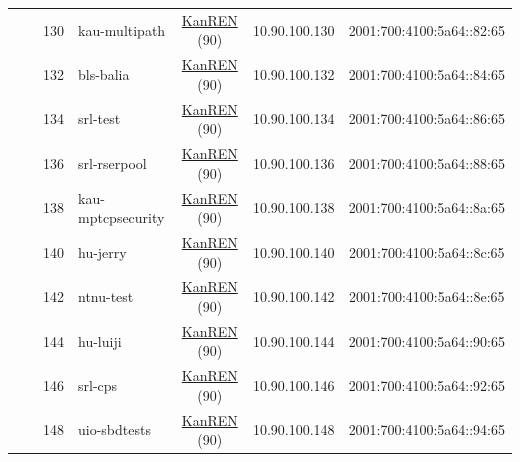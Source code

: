 \begin{small}
\begin{center}
\begin{longtable}{|c|c|c|c|c|c|c|c|}
  &  & \tiny{130} & \multicolumn{1}{|l|}{\tiny{kau-multipath}} & \multicolumn{2}{|c|}{\tiny{\href{http://www.kanren.net}{KanREN} (90)}} & \tiny{10.90.100.130} & \tiny{2001:700:4100:5a64::82:65} \\* \cline{3-3}\cline{4-4}\cline{5-5}\cline{6-6}\cline{7-7}\cline{8-8}
  &  & \tiny{132} & \multicolumn{1}{|l|}{\tiny{bls-balia}} & \multicolumn{2}{|c|}{\tiny{\href{http://www.kanren.net}{KanREN} (90)}} & \tiny{10.90.100.132} & \tiny{2001:700:4100:5a64::84:65} \\* \cline{3-3}\cline{4-4}\cline{5-5}\cline{6-6}\cline{7-7}\cline{8-8}
  &  & \tiny{134} & \multicolumn{1}{|l|}{\tiny{srl-test}} & \multicolumn{2}{|c|}{\tiny{\href{http://www.kanren.net}{KanREN} (90)}} & \tiny{10.90.100.134} & \tiny{2001:700:4100:5a64::86:65} \\* \cline{3-3}\cline{4-4}\cline{5-5}\cline{6-6}\cline{7-7}\cline{8-8}
  &  & \tiny{136} & \multicolumn{1}{|l|}{\tiny{srl-rserpool}} & \multicolumn{2}{|c|}{\tiny{\href{http://www.kanren.net}{KanREN} (90)}} & \tiny{10.90.100.136} & \tiny{2001:700:4100:5a64::88:65} \\* \cline{3-3}\cline{4-4}\cline{5-5}\cline{6-6}\cline{7-7}\cline{8-8}
  &  & \tiny{138} & \multicolumn{1}{|l|}{\tiny{kau-mptcpsecurity}} & \multicolumn{2}{|c|}{\tiny{\href{http://www.kanren.net}{KanREN} (90)}} & \tiny{10.90.100.138} & \tiny{2001:700:4100:5a64::8a:65} \\* \cline{3-3}\cline{4-4}\cline{5-5}\cline{6-6}\cline{7-7}\cline{8-8}
  &  & \tiny{140} & \multicolumn{1}{|l|}{\tiny{hu-jerry}} & \multicolumn{2}{|c|}{\tiny{\href{http://www.kanren.net}{KanREN} (90)}} & \tiny{10.90.100.140} & \tiny{2001:700:4100:5a64::8c:65} \\* \cline{3-3}\cline{4-4}\cline{5-5}\cline{6-6}\cline{7-7}\cline{8-8}
  &  & \tiny{142} & \multicolumn{1}{|l|}{\tiny{ntnu-test}} & \multicolumn{2}{|c|}{\tiny{\href{http://www.kanren.net}{KanREN} (90)}} & \tiny{10.90.100.142} & \tiny{2001:700:4100:5a64::8e:65} \\* \cline{3-3}\cline{4-4}\cline{5-5}\cline{6-6}\cline{7-7}\cline{8-8}
  &  & \tiny{144} & \multicolumn{1}{|l|}{\tiny{hu-luiji}} & \multicolumn{2}{|c|}{\tiny{\href{http://www.kanren.net}{KanREN} (90)}} & \tiny{10.90.100.144} & \tiny{2001:700:4100:5a64::90:65} \\* \cline{3-3}\cline{4-4}\cline{5-5}\cline{6-6}\cline{7-7}\cline{8-8}
  &  & \tiny{146} & \multicolumn{1}{|l|}{\tiny{srl-cps}} & \multicolumn{2}{|c|}{\tiny{\href{http://www.kanren.net}{KanREN} (90)}} & \tiny{10.90.100.146} & \tiny{2001:700:4100:5a64::92:65} \\* \cline{3-3}\cline{4-4}\cline{5-5}\cline{6-6}\cline{7-7}\cline{8-8}
  &  & \tiny{148} & \multicolumn{1}{|l|}{\tiny{uio-sbdtests}} & \multicolumn{2}{|c|}{\tiny{\href{http://www.kanren.net}{KanREN} (90)}} & \tiny{10.90.100.148} & \tiny{2001:700:4100:5a64::94:65} \\ \hline
\end{longtable}
\end{center}
\end{small}



